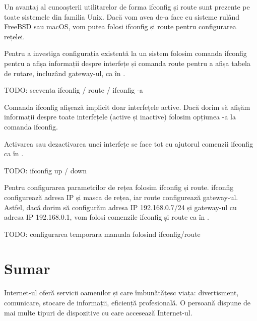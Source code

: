 Un avantaj al cunoașterii utilitarelor de forma ifconfig și route sunt prezente pe toate sistemele din familia Unix. Dacă vom avea de-a face cu sisteme rulând FreeBSD sau macOS, vom putea folosi ifconfig și route pentru configurarea rețelei.

Pentru a investiga configurația existentă la un sistem folosim comanda ifconfig pentru a afișa informații despre interfețe și comanda route pentru a afișa tabela de rutare, incluzând gateway-ul, ca în .

\begin{screen}[caption={Vizualizarea parametrilor de rețea cu ifconfig/route},label={lst:net:show-ifconfig-route}]
TODO: secventa ifconfig / route / ifconfig -a
\end{screen}

Comanda ifconfig afișează implicit doar interfețele active. Dacă dorim să afișăm informații despre toate interfețele (active și inactive) folosim opțiunea -a la comanda ifconfig.

Activarea sau dezactivarea unei interfețe se face tot cu ajutorul comenzii ifconfig ca în .

\begin{screen}[caption={Activarea și dezactivarea unei interfețe folosind ifconfig},label={lst:net:enable-ifconfig}]
TODO: ifconfig up / down
\end{screen}

Pentru configurarea parametrilor de rețea folosim ifconfig și route. ifconfig configurează adresa IP și masca de rețea, iar route configurează gateway-ul. Astfel, dacă dorim să configurăm adresa IP 192.168.0.7/24 și gateway-ul cu adresa IP 192.168.0.1, vom folosi comenzile ifconfig și route ca în .

\begin{screen}[caption={Configurarea parametrilor de rețea folosind ifconfig/route},label={lst:net:config-ifconfig-route}]
TODO: configurarea temporara manuala folosind ifconfig/route
\end{screen}

\section{Sumar}
\label{sec:net:summary}

Internet-ul oferă servicii oamenilor și care îmbunătățesc viața: divertisment, comunicare, stocare de informații, eficiență profesională. O persoană dispune de mai multe tipuri de dispozitive cu care accesează Internet-ul.

